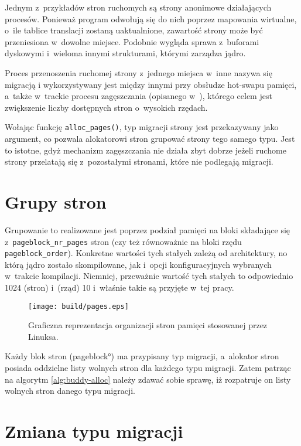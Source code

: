 Jednym z~przykładów stron ruchomych są strony anonimowe działających
procesów.  Ponieważ program odwołują się do nich poprzez mapowania
wirtualne, o~ile tablice translacji zostaną uaktualnione, zawartość
strony może być przeniesiona w~dowolne miejsce.  Podobnie wygląda
sprawa z~buforami dyskowymi i~wieloma innymi strukturami, którymi
zarządza jądro.

Proces przenoszenia ruchomej strony z~jednego miejsca w~inne nazywa
się migracją i wykorzystywany jest między innymi przy obsłudze
hot-swapu pamięci, a~także w~trackie procesu zagęszczania (opisanego
w~\cite{bib:compaction}), którego celem jest zwiększenie liczby
dostępnych stron o~wysokich rzędach.

Wołając funkcję \lstinline|alloc_pages()|, typ migracji strony jest
przekazywany jako argument, co pozwala alokatorowi stron grupować
strony tego samego typu.  Jest to istotne, gdyż mechanizm zagęszczania
nie działa zbyt dobrze jeżeli ruchome strony przelatają się
z~pozostałymi stronami, które nie podlegają migracji.

\section{Grupy stron}

Grupowanie to realizowane jest poprzez podział pamięci na bloki
składające się z~\lstinline|pageblock_nr_pages| stron (czy też
równoważnie na bloki rzędu \lstinline|pageblock_order|).  Konkretne
wartości tych stałych zależą od architektury, no którą jądro zostało
skompilowane, jak i~opcji konfiguracyjnych wybranych w~trakcie
kompilacji.  Niemniej, przeważnie wartość tych stałych to odpowiednio
1024 (stron) i~(rząd) 10 i~właśnie takie są przyjęte w~tej pracy.

\begin{figure}[tbh]
\begin{center}
\texttt{[image: build/pages.eps]}
\end{center}
\caption{Graficzna reprezentacja organizacji stron pamięci stosowanej
  przez Linuksa.}
\end{figure}

Każdy blok stron (\ang{pageblock}) ma przypisany typ migracji,
a~alokator stron posiada oddzielne listy wolnych stron dla każdego
typu migracji.  Zatem patrząc na algorytm \ref{alg:buddy-alloc} należy
zdawać sobie sprawę, iż rozpatruje on listy wolnych stron danego typu
migracji.

\section{Zmiana typu migracji}\label{sec:type-change}

